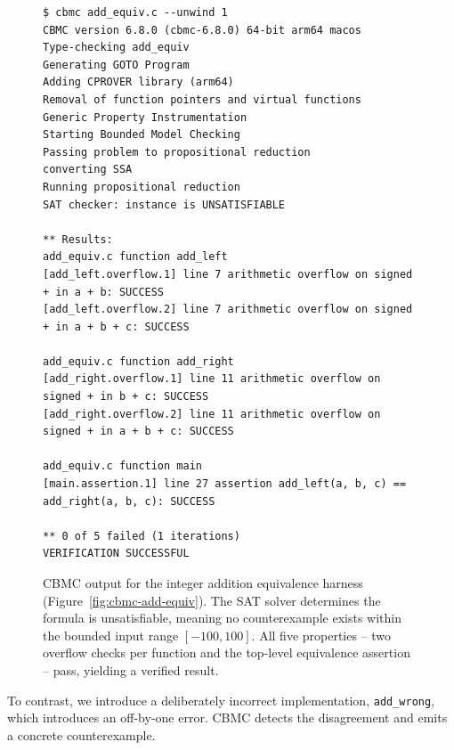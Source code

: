 \documentclass{article}
\begin{document}
\begin{figure}[H]
\begin{verbatim}
$ cbmc add_equiv.c --unwind 1
CBMC version 6.8.0 (cbmc-6.8.0) 64-bit arm64 macos
Type-checking add_equiv
Generating GOTO Program
Adding CPROVER library (arm64)
Removal of function pointers and virtual functions
Generic Property Instrumentation
Starting Bounded Model Checking
Passing problem to propositional reduction
converting SSA
Running propositional reduction
SAT checker: instance is UNSATISFIABLE

** Results:
add_equiv.c function add_left
[add_left.overflow.1] line 7 arithmetic overflow on signed + in a + b: SUCCESS
[add_left.overflow.2] line 7 arithmetic overflow on signed + in a + b + c: SUCCESS

add_equiv.c function add_right
[add_right.overflow.1] line 11 arithmetic overflow on signed + in b + c: SUCCESS
[add_right.overflow.2] line 11 arithmetic overflow on signed + in a + b + c: SUCCESS

add_equiv.c function main
[main.assertion.1] line 27 assertion add_left(a, b, c) == add_right(a, b, c): SUCCESS

** 0 of 5 failed (1 iterations)
VERIFICATION SUCCESSFUL
\end{verbatim}
\caption{CBMC output for the integer addition equivalence harness (Figure~\ref{fig:cbmc-add-equiv}). The SAT solver determines the formula is unsatisfiable, meaning no counterexample exists within the bounded input range $[-100, 100]$. All five properties -- two overflow checks per function and the top-level equivalence assertion -- pass, yielding a verified result.}
\label{fig:cbmc-add-output}
\end{figure}

To contrast, we introduce a deliberately incorrect implementation, \texttt{add\_wrong}, which introduces an off-by-one error. CBMC detects the disagreement and emits a concrete counterexample.
\end{document}
